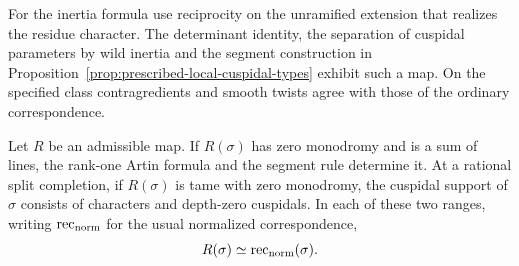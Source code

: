 For the inertia formula use reciprocity on the unramified extension that realizes the residue character. The determinant identity, the separation of cuspidal parameters by wild inertia and the segment construction in Proposition~\ref{prop:prescribed-local-cuspidal-types} exhibit such a map. On the specified class contragredients and smooth twists agree with those of the ordinary correspondence. \cite{henniart-local,adrian-roe}

\begin{proposition}
Let \(R\) be an admissible map. If \(R(\sigma)\) has zero monodromy
and is a sum of lines, the rank-one Artin formula and the segment
rule determine it. At a rational split completion, if \(R(\sigma)\)
is tame with zero monodromy, the cuspidal support of \(\sigma\)
consists of characters and depth-zero cuspidals. In each of these two ranges, writing \(\operatorname{rec}_{\rm norm}\) for the usual normalized correspondence, 
\[
 R(\sigma)\simeq\operatorname{rec}_{\rm norm}(\sigma).
\]

\end{proposition}

